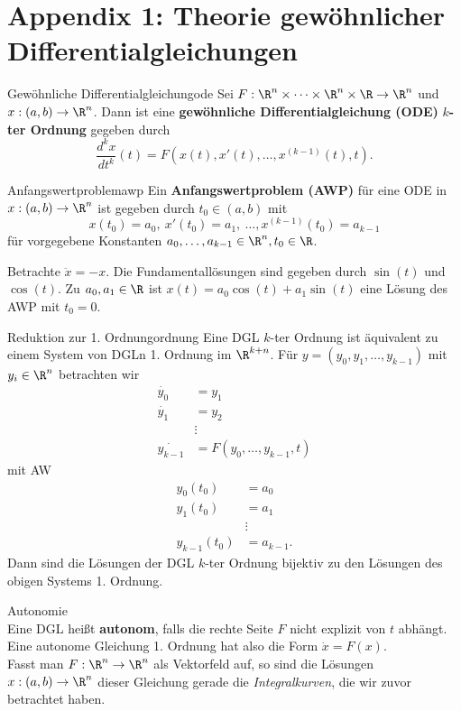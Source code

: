\section{Appendix 1: Theorie gewöhnlicher Differentialgleichungen}
\label{subsec:ode}
\begin{definition}{Gewöhnliche Differentialgleichung}{ode}
Sei $F: \R^n \times \cdots \times \R^n \times \R \to \R^n$ und $x: (a,b) \to \R^n$. Dann ist eine \textbf{gewöhnliche Differentialgleichung (ODE)} $k$\textbf{-ter Ordnung} gegeben durch
\begin{equation}
\frac{d^k x}{dt^k} (t)=F(x(t), x'(t), \dots, x^{(k-1)}(t), t).
\end{equation}
\end{definition}
\begin{definition}{Anfangswertproblem}{awp}
Ein \textbf{Anfangswertproblem (AWP)} für eine ODE in $x: (a,b) \to \R^n$ ist gegeben durch $t_0 \in (a,b)$ mit 
\begin{equation}
x(t_0) = a_0, \ x'(t_0)=a_1, \ \dots, x^{(k-1)}(t_0)=a_{k-1}
\end{equation}
für vorgegebene Konstanten $a_0, \dots, a_{k-1} \in \R^n, t_0 \in \R$.
\end{definition}
\begin{beispiel}
Betrachte $\ddot{x} = -x$. Die Fundamentallösungen sind gegeben durch $\sin(t)$ und $\cos(t)$. Zu $a_0, a_1 \in \R$ ist $x(t)=a_0 \cos(t) + a_1 \sin(t)$ eine Lösung des AWP mit $t_0=0$.
\end{beispiel}
\begin{satz}{Reduktion zur 1. Ordnung}{ordnung}
Eine DGL $k$-ter Ordnung ist äquivalent zu einem System von DGLn 1. Ordnung im $\R^{k+n}$. Für $y = (y_0, y_1, \dots, y_{k-1})$ mit $y_i \in \R^n$ betrachten wir
\begin{align}
\dot{y_0} &= y_1 \\
\dot{y_1} &= y_2 \\
&\vdots \\
\dot{y_{k-1}} &= F(y_0, \dots, y_{k-1}, t)
\end{align}
mit AW
\begin{align}
y_0(t_0) &= a_0 \\
y_1(t_0) &= a_1 \\
&\vdots \\
y_{k-1}(t_0) &= a_{k-1}.
\end{align}
Dann sind die Lösungen der DGL $k$-ter Ordnung bijektiv zu den Lösungen des obigen Systems 1. Ordnung.
\end{satz}
\begin{bemerkung}Autonomie\\
Eine DGL heißt \textbf{autonom}, falls die rechte Seite $F$ nicht explizit von $t$ abhängt.\\
Eine autonome Gleichung 1. Ordnung hat also die Form $\dot{x}=F(x)$.\\
Fasst man $F: \R^n \to \R^n$ als Vektorfeld auf, so sind die Lösungen $x: (a,b) \to \R^n$ dieser Gleichung gerade die \textit{Integralkurven}, die wir zuvor betrachtet haben.
\end{bemerkung}

